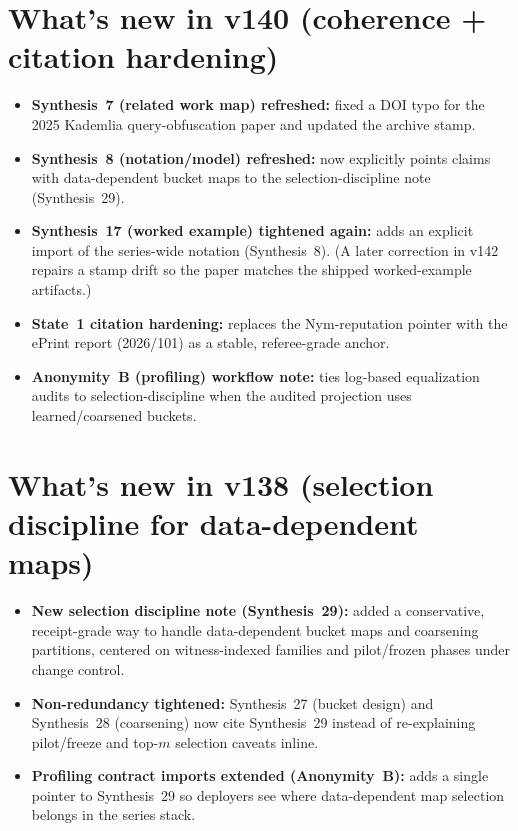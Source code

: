 \documentclass[11pt]{article}
\begin{document}
\section{What's new in v140 (coherence + citation hardening)}
\begin{itemize}[leftmargin=*]
\item \textbf{Synthesis~7 (related work map) refreshed:} fixed a DOI typo for the 2025 Kademlia query-obfuscation paper and updated the archive stamp.
\item \textbf{Synthesis~8 (notation/model) refreshed:} now explicitly points claims with data-dependent bucket maps to the selection-discipline note (Synthesis~29).
\item \textbf{Synthesis~17 (worked example) tightened again:} adds an explicit import of the series-wide notation (Synthesis~8). (A later correction in v142 repairs a stamp drift so the paper matches the shipped worked-example artifacts.)
\item \textbf{State~1 citation hardening:} replaces the Nym-reputation pointer with the ePrint report (2026/101) as a stable, referee-grade anchor.
\item \textbf{Anonymity~B (profiling) workflow note:} ties log-based equalization audits to selection-discipline when the audited projection uses learned/coarsened buckets.
\end{itemize}

\section{What's new in v138 (selection discipline for data-dependent maps)}
\begin{itemize}[leftmargin=*]
\item \textbf{New selection discipline note (Synthesis~29):} added a conservative, receipt-grade way to handle data-dependent bucket maps and coarsening partitions, centered on witness-indexed families and pilot/frozen phases under change control.
\item \textbf{Non-redundancy tightened:} Synthesis~27 (bucket design) and Synthesis~28 (coarsening) now cite Synthesis~29 instead of re-explaining pilot/freeze and top-$m$ selection caveats inline.
\item \textbf{Profiling contract imports extended (Anonymity~B):} adds a single pointer to Synthesis~29 so deployers see where data-dependent map selection belongs in the series stack.
\end{itemize}
\end{document}
